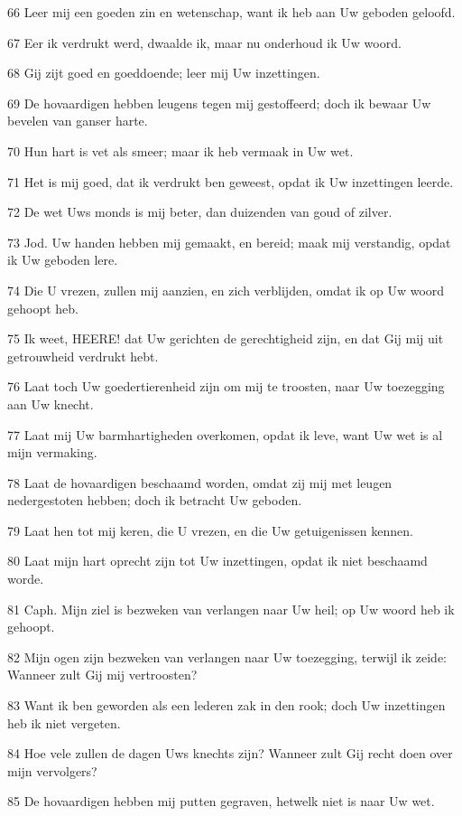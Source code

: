 \par 66 Leer mij een goeden zin en wetenschap, want ik heb aan Uw geboden geloofd.
\par 67 Eer ik verdrukt werd, dwaalde ik, maar nu onderhoud ik Uw woord.
\par 68 Gij zijt goed en goeddoende; leer mij Uw inzettingen.
\par 69 De hovaardigen hebben leugens tegen mij gestoffeerd; doch ik bewaar Uw bevelen van ganser harte.
\par 70 Hun hart is vet als smeer; maar ik heb vermaak in Uw wet.
\par 71 Het is mij goed, dat ik verdrukt ben geweest, opdat ik Uw inzettingen leerde.
\par 72 De wet Uws monds is mij beter, dan duizenden van goud of zilver.
\par 73 Jod. Uw handen hebben mij gemaakt, en bereid; maak mij verstandig, opdat ik Uw geboden lere.
\par 74 Die U vrezen, zullen mij aanzien, en zich verblijden, omdat ik op Uw woord gehoopt heb.
\par 75 Ik weet, HEERE! dat Uw gerichten de gerechtigheid zijn, en dat Gij mij uit getrouwheid verdrukt hebt.
\par 76 Laat toch Uw goedertierenheid zijn om mij te troosten, naar Uw toezegging aan Uw knecht.
\par 77 Laat mij Uw barmhartigheden overkomen, opdat ik leve, want Uw wet is al mijn vermaking.
\par 78 Laat de hovaardigen beschaamd worden, omdat zij mij met leugen nedergestoten hebben; doch ik betracht Uw geboden.
\par 79 Laat hen tot mij keren, die U vrezen, en die Uw getuigenissen kennen.
\par 80 Laat mijn hart oprecht zijn tot Uw inzettingen, opdat ik niet beschaamd worde.
\par 81 Caph. Mijn ziel is bezweken van verlangen naar Uw heil; op Uw woord heb ik gehoopt.
\par 82 Mijn ogen zijn bezweken van verlangen naar Uw toezegging, terwijl ik zeide: Wanneer zult Gij mij vertroosten?
\par 83 Want ik ben geworden als een lederen zak in den rook; doch Uw inzettingen heb ik niet vergeten.
\par 84 Hoe vele zullen de dagen Uws knechts zijn? Wanneer zult Gij recht doen over mijn vervolgers?
\par 85 De hovaardigen hebben mij putten gegraven, hetwelk niet is naar Uw wet.
